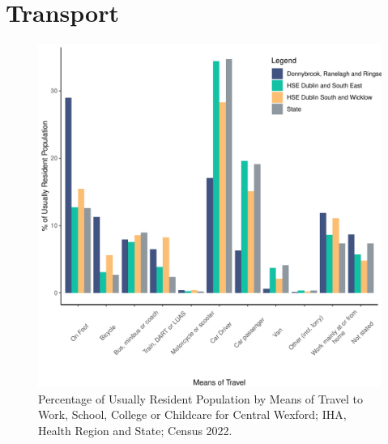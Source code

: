 \documentclass{article}
\begin{document}
\section{Transport}\label{sect:Trans}
\begin{figure}[H]
	\centering
	\includegraphics[width = 120mm]{../figures/TravelED.pdf}
	\caption{Percentage of Usually Resident Population by Means of Travel to Work, School, College or Childcare for Central Wexford; IHA, Health Region and State; Census 2022.}
	\label{fig:vbnv}
	\end{figure}
\end{document}
